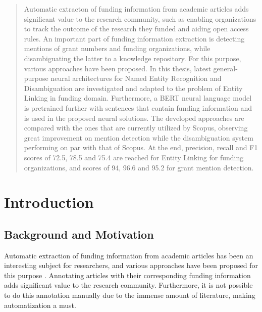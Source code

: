 \documentclass{report}
\theoremstyle{definition}
\theoremstyle{remark}
\begin{document}
\begin{abstract}
Automatic extracton of funding information from academic articles adds significant value to the research community, such as enabling organizations to track the outcome of the research they funded and aiding open access rules. An important part of funding information extraction is detecting mentions of grant numbers and funding organizations, while disambiguating the latter to a knowledge repository. For this purpose, various approaches have been proposed. In this thesis, latest general-purpose neural architectures for Named Entity Recognition and Disambiguation are investigated and adapted to the problem of Entity Linking in funding domain. Furthermore, a BERT neural language model is pretrained further with sentences that contain funding information and is used in the proposed neural solutions. The developed approaches are compared with the ones that are currently utilized by Scopus, observing great improvement on mention detection while the disambiguation system performing on par with that of Scopus. At the end, precision, recall and F1 scores of 72.5, 78.5 and 75.4 are reached for Entity Linking for funding organizations, and scores of 94, 96.6 and 95.2 for grant mention detection. 
\end{abstract}



\tableofcontents


\chapter{Introduction}
\label{sec:intro}
\section{Background and Motivation}
Automatic extraction of funding information from academic articles has been an interesting subject for researchers, and various approaches have been proposed for this purpose \cite{ElsPaper,AckExtract,GrantExtractor}. Annotating articles with their corresponding funding information adds significant value to the research community. Furthermore, it is not possible to do this annotation manually due to the immense amount of literature, making automatization a must.
\end{document}
